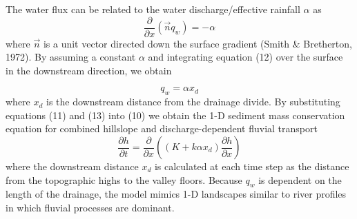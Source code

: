 The water flux can be related to the water discharge/effective rainfall $\alpha$ as
\[
\frac{\partial}{\partial x} (\vec{n} q_w) = -\alpha
\]
where $\vec n$ is a unit vector directed down the surface gradient (Smith \& Bretherton, 1972). 
By assuming a constant $\alpha$ and integrating equation (12) over the surface in the downstream direction, we obtain

\[
q_w = \alpha x_d
\]
where $x_d$ is the downstream distance from the drainage divide. By substituting equations (11) and
(13) into (10) we obtain the 1-D sediment mass conservation equation for combined hillslope and
discharge-dependent fluvial transport
\[
\frac{\partial h}{\partial t} = \frac{\partial}{\partial x} \left( (K+k \alpha x_d) 
\frac{\partial h}{\partial x}   \right)
\]
where the downstream distance $x_d$ is calculated at each time step as the distance from the topographic highs
to the valley floors. Because $q_w$ is dependent on the length of the drainage, the model mimics 1-D landscapes
similar to river profiles in which fluvial processes are dominant.

